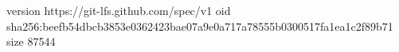 version https://git-lfs.github.com/spec/v1
oid sha256:beefb54dbcb3853e0362423bae07a9e0a717a78555b0300517fa1ea1c2f89b71
size 87544
